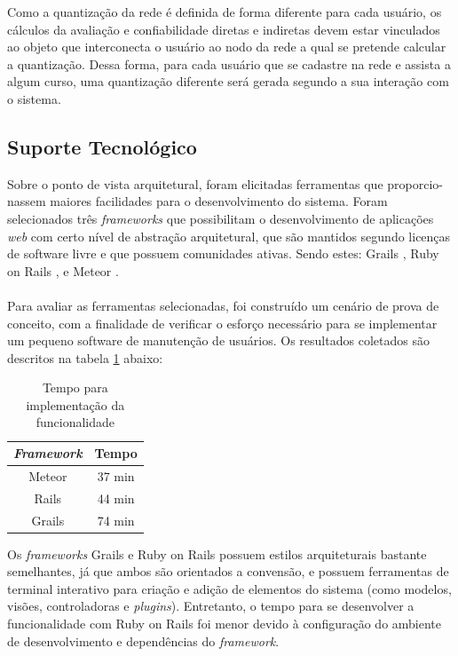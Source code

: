 Como a quantização da rede é definida de forma diferente para cada usuário, os cálculos da avaliação e confiabilidade diretas e indiretas devem estar vinculados ao objeto que interconecta o usuário ao nodo da rede a qual se pretende calcular a quantização. Dessa forma, para cada usuário que se cadastre na rede e assista a algum curso, uma quantização diferente será gerada segundo a sua interação com o sistema.

\subsection{Suporte Tecnológico}

Sobre o ponto de vista arquitetural, foram elicitadas ferramentas que proporcio- nassem maiores facilidades para o desenvolvimento do sistema. Foram selecionados três \textit{frameworks} que possibilitam o desenvolvimento de aplicações \textit{web} com certo nível de abstração arquitetural, que são mantidos segundo licenças de software livre e que possuem comunidades ativas. Sendo estes: Grails \cite{grails2015}, Ruby on Rails \cite{rubyrails2015}, e Meteor \cite{meteor2015}. 
\\
\\

Para avaliar as ferramentas selecionadas, foi construído um cenário de prova de conceito, com a finalidade de verificar o esforço necessário para se implementar um pequeno software de manutenção de usuários. Os resultados coletados são descritos na tabela \ref{tab:tempo} abaixo:

\begin{table}[h!]
	\centering
	\begin{tabular}{| c | c |}
		\hline
		\textit{Framework} & Tempo \\
		\hline
		Meteor & 37 min \\
		\hline
		Rails & 44 min \\
		\hline
		Grails & 74 min \\
		\hline
	\end{tabular}
	\caption{Tempo para implementação da funcionalidade}
	\label{tab:tempo}
\end{table}

Os \textit{frameworks} Grails e Ruby on Rails possuem estilos arquiteturais bastante semelhantes, já que ambos são orientados a convensão, e possuem ferramentas de terminal interativo para criação e adição de elementos do sistema (como modelos, visões, controladoras e \textit{plugins}). Entretanto, o tempo para se desenvolver a funcionalidade com Ruby on Rails foi menor devido à configuração do ambiente de desenvolvimento e dependências do \textit{framework}.

